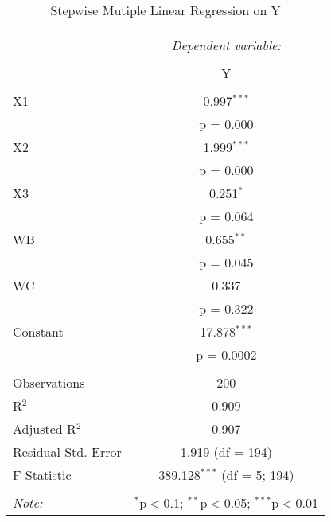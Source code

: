 
\begin{table}[!htbp] \centering 
  \caption{Stepwise Mutiple Linear Regression on Y} 
  \label{tab::multi_optimal_1} 
\begin{tabular}{@{\extracolsep{5pt}}lc} 
\\[-1.8ex]\hline 
\hline \\[-1.8ex] 
 & \multicolumn{1}{c}{\textit{Dependent variable:}} \\ 
\cline{2-2} 
\\[-1.8ex] & Y \\ 
\hline \\[-1.8ex] 
 X1 & 0.997$^{***}$ \\ 
  & p = 0.000 \\ 
  X2 & 1.999$^{***}$ \\ 
  & p = 0.000 \\ 
  X3 & 0.251$^{*}$ \\ 
  & p = 0.064 \\ 
  WB & 0.655$^{**}$ \\ 
  & p = 0.045 \\ 
  WC & 0.337 \\ 
  & p = 0.322 \\ 
  Constant & 17.878$^{***}$ \\ 
  & p = 0.0002 \\ 
 \hline \\[-1.8ex] 
Observations & 200 \\ 
R$^{2}$ & 0.909 \\ 
Adjusted R$^{2}$ & 0.907 \\ 
Residual Std. Error & 1.919 (df = 194) \\ 
F Statistic & 389.128$^{***}$ (df = 5; 194) \\ 
\hline 
\hline \\[-1.8ex] 
\textit{Note:}  & \multicolumn{1}{r}{$^{*}$p$<$0.1; $^{**}$p$<$0.05; $^{***}$p$<$0.01} \\ 
\end{tabular} 
\end{table} 
